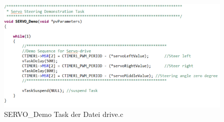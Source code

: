\begin{figure}[H] %
\includegraphics[width=.85\textwidth]{sec5/images/ServoC2} 
\centering
\captionsetup{width=.95\textwidth}
\caption[SERVO\_Demo Task der Datei \glqq{}drive.c\grqq{}]{SERVO\_Demo Task der Datei \glqq{}drive.c\grqq{}}\centering
\label{fig:ServoC2}
\end{figure}

\newpage